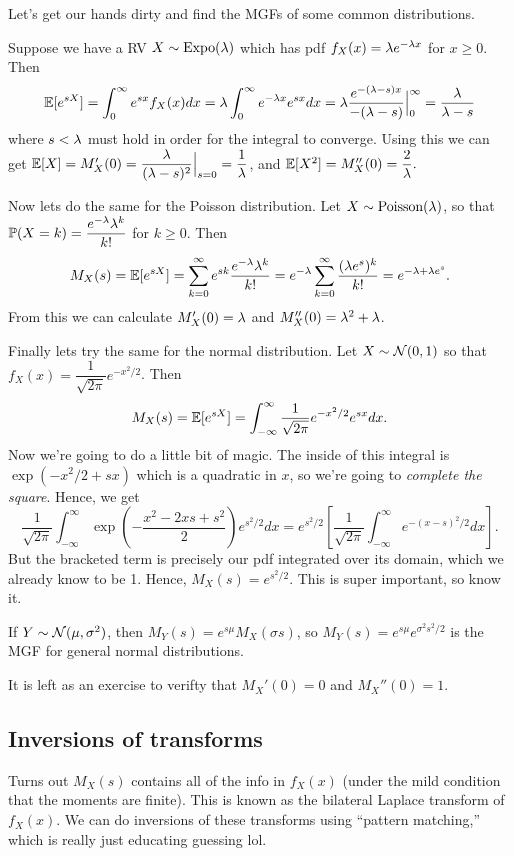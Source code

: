 \documentclass[11 pt]{scrartcl}
\begin{document}
Let's get our hands dirty and find the MGFs of some common distributions. 
\begin{example}
    Suppose we have a RV $X\sim \text{Expo}(\lambda)$ which has pdf $f_X(x) = \lambda e^{-\lambda x}$ for $x\geq 0$. Then 
    \[ \mathbb E[e^{sX}] = \int_0^{\infty} e^{sx}f_X(x) dx = \lambda\int_0^{\infty} e^{-\lambda x} e^{sx} dx = \lambda \dfrac{e^{-(\lambda-s)x}}{-(\lambda-s)} \Big|^{\infty}_0 = \dfrac{\lambda}{\lambda-s}\] 
    where $s < \lambda$ must hold in order for the integral to converge. Using this we can get $\mathbb E[X] = M_X'(0) = \dfrac{\lambda}{(\lambda-s)^2}\Big|_{s=0} = \dfrac{1}{\lambda}$, and $\mathbb E[X^2] = M_X''(0) = \dfrac{2}{\lambda}.$ 
\end{example}

\begin{example}
    Now lets do the same for the Poisson distribution. Let $X\sim \text{Poisson}(\lambda)$, so that $\mathbb P(X=k) = \dfrac{e^{-\lambda}\lambda^k}{k!}$ for $k\geq 0$. Then 
    \[ M_X(s) = \mathbb E[e^{sX}] = \sum_{k = 0}^\infty e^{sk}\dfrac{e^{-\lambda}\lambda^k}{k!} = e^{-\lambda}\sum_{k=0}^\infty \dfrac{(\lambda e^s)^k}{k!} = e^{-\lambda+\lambda e^s}.\]
    From this we can calculate $M_X'(0) = \lambda$ and $M_X''(0) = \lambda^2+\lambda$. 
\end{example}

\begin{example}
    Finally lets try the same for the normal distribution. Let $X\sim \mathcal{N}(0,1)$ so that $f_X(x) = \dfrac{1}{\sqrt{2\pi}}e^{-x^2/2}$. Then 
    \[ M_X(s) = \mathbb E[e^{sX}] = \int_{-\infty}^\infty\dfrac{1}{\sqrt{2\pi}}e^{-x^2/2}e^{sx}dx.\]
    Now we're going to do a little bit of magic. The inside of this integral is $\exp(-x^2/2 + sx)$ which is a quadratic in $x$, so we're going to \emph{complete the square}. Hence, we get 
    \[ \dfrac{1}{\sqrt{2\pi}} \int_{-\infty}^\infty  \exp\left(-\dfrac{x^2-2xs+s^2}{2}\right) e^{s^2/2}dx = e^{s^2/2} \left[ \dfrac{1}{\sqrt{2\pi}} \int_{-\infty}^\infty e^{-(x-s)^2/2}dx\right].\]
    But the bracketed term is precisely our pdf integrated over its domain, which we already know to be 1. Hence, $M_X(s) = e^{s^2/2}$. This is super important, so know it. 

    If $Y\sim \mathcal{N}(\mu, \sigma^2)$, then $M_Y(s) = e^{s\mu}M_X(\sigma s)$, so $M_Y(s) = e^{s\mu}e^{\sigma^2s^2/2}$ is the MGF for general normal distributions. 
    
    It is left as an exercise to verifty that $M_X'(0) = 0$ and $M_X''(0) = 1$. 
\end{example}

\subsection{Inversions of transforms} 
Turns out $M_X(s)$ contains all of the info in $f_X(x)$ (under the mild condition that the moments are finite). This is known as the bilateral Laplace transform of $f_X(x)$. We can do inversions of these transforms using ``pattern matching,'' which is really just educating guessing lol. 
\end{document}
